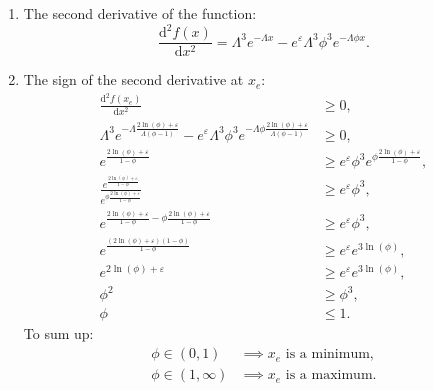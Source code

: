 \begin{enumerate}[label=\arabic*.]
\item The second derivative of the function:
\[
\frac{\mathrm{d}^2 f(x)}{\mathrm{d}x^2} = \Lambda^3 e^{-\Lambda x} - e^{\varepsilon}\Lambda^3\phi^3 e^{-\Lambda\phi x}.
\]

\item The sign of the second derivative at $x_e$:
\begin{align*}
\frac{\mathrm{d}^2 f(x_e)}{\mathrm{d}x^2} &\geq 0, \\
\Lambda^3 e^{-\Lambda \frac{2\ln(\phi) + \varepsilon}{\Lambda(\phi-1)}} - e^{\varepsilon}\Lambda^3\phi^3 e^{-\Lambda\phi \frac{2\ln(\phi)+\varepsilon}{\Lambda(\phi-1)}} &\geq 0, \\
e^{\frac{2\ln(\phi)+\varepsilon}{1-\phi}} &\geq e^{\varepsilon}\phi^3 e^{\phi \frac{2\ln(\phi)+\varepsilon}{1-\phi}}, \\
\frac{e^{\frac{2\ln(\phi)+\varepsilon}{1-\phi}}}{e^{\phi \frac{2\ln(\phi)+\varepsilon}{1-\phi}}} &\geq e^{\varepsilon}\phi^3, \\
e^{\frac{2\ln(\phi)+\varepsilon}{1-\phi} - \phi \frac{2\ln(\phi)+\varepsilon}{1-\phi}} &\geq e^{\varepsilon}\phi^3, \\
e^{\frac{(2\ln(\phi)+\varepsilon)(1-\phi)}{1-\phi}} &\geq e^{\varepsilon} e^{3\ln(\phi)}, \\
e^{2\ln(\phi)+\varepsilon} &\geq e^{\varepsilon} e^{3\ln(\phi)}, \\
\phi^2 &\geq \phi^3, \\
\phi &\leq 1.
\end{align*}
To sum up:
\begin{align*}
\phi \in (0, 1) &\implies x_e \text{ is a minimum}, \\
\phi \in (1, \infty) &\implies x_e \text{ is a maximum}.
\end{align*}


\end{enumerate}
